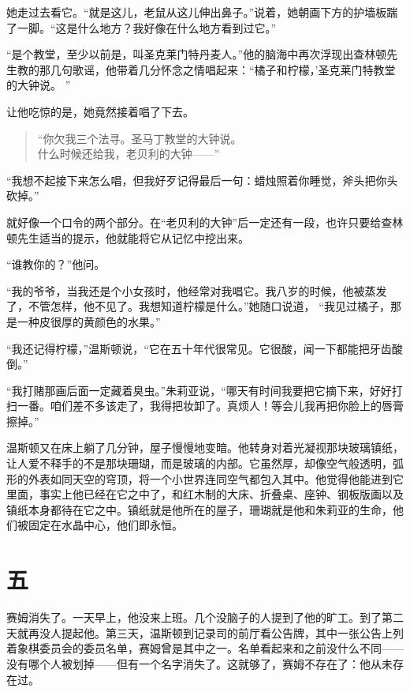 她走过去看它。``就是这儿，老鼠从这儿伸出鼻子。''说着，她朝画下方的护墙板踹了一脚。``这是什么地方？我好像在什么地方看到过它。''

``是个教堂，至少以前是，叫圣克莱门特丹麦人。''他的脑海中再次浮现出查林顿先生教的那几句歌谣，他带着几分怀念之情唱起来：``橘子和柠檬，'圣克莱门特教堂的大钟说。
''

让他吃惊的是，她竟然接着唱了下去。

\begin{quotation}
 \noindent ``你欠我三个法寻。圣马丁教堂的大钟说。\\
  什么时候还给我，老贝利的大钟——''
\end{quotation}

``我想不起接下来怎么唱，但我好歹记得最后一句：蜡烛照着你睡觉，斧头把你头砍掉。''

就好像一个口令的两个部分。在``老贝利的大钟''后一定还有一段，也许只要给查林顿先生适当的提示，他就能将它从记忆中挖出来。

``谁教你的？''他问。

``我的爷爷，当我还是个小女孩时，他经常对我唱它。我八岁的时候，他被蒸发了，不管怎样，他不见了。我想知道柠檬是什么。''她随口说道，
``我见过橘子，那是一种皮很厚的黄颜色的水果。''

``我还记得柠檬，''温斯顿说，``它在五十年代很常见。它很酸，闻一下都能把牙齿酸倒。''

``我打赌那画后面一定藏着臭虫。''朱莉亚说，``哪天有时间我要把它摘下来，好好打扫一番。咱们差不多该走了，我得把妆卸了。真烦人！等会儿我再把你脸上的唇膏擦掉。''

温斯顿又在床上躺了几分钟，屋子慢慢地变暗。他转身对着光凝视那块玻璃镇纸，让人爱不释手的不是那块珊瑚，而是玻璃的内部。它虽然厚，却像空气般透明，弧形的外表如同天空的穹顶，将一个小世界连同空气都包入其中。他觉得他能进到它里面，事实上他已经在它之中了，和红木制的大床、折叠桌、座钟、钢板版画以及镇纸本身都待在它之中。镇纸就是他所在的屋子，珊瑚就是他和朱莉亚的生命，他们被固定在水晶中心，他们即永恒。

\section*{五}\label{ux5341ux4e09}

赛姆消失了。一天早上，他没来上班。几个没脑子的人提到了他的旷工。到了第二天就再没人提起他。第三天，温斯顿到记录司的前厅看公告牌，其中一张公告上列着象棋委员会的委员名单，赛姆曾是其中之一。名单看起来和之前没什么不同——没有哪个人被划掉——但有一个名字消失了。这就够了，赛姆不存在了：他从未存在过。

